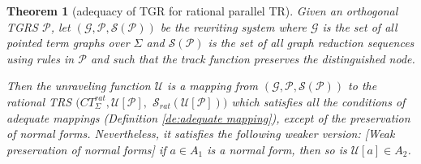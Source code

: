 \documentclass{eptcs}
\theoremstyle{plain}
\newtheorem{theorem}{Theorem} \newtheorem{lemma}[theorem]{Lemma}
\theoremstyle{definition}
\begin{document}
\begin{theorem} 
[adequacy of TGR for rational parallel TR]
\label{th:adequacy}
Given an orthogonal TGRS $\mathcal{P}$, let $(\mathcal{G}, \mathcal{P}, \mathcal{
S}(\mathcal{P}))$ be the rewriting system where $\mathcal{G}$ is the set of 
all pointed term graphs over $\Sigma$ and $\mathcal{S}(\mathcal{P})$ is the 
set of all graph reduction sequences using rules in $\mathcal{P}$ and 
such that the track function preserves the distinguished node. 

Then the unraveling function $\mathcal{U}$ is a mapping from  $(\mathcal{G}, 
\mathcal{P}, \mathcal{S}(\mathcal{P}))$ to the rational TRS $(CT_\Sigma^{rat}, 
\mathcal{
U}[\mathcal{P}],$ $\mathcal{S}_{rat}(\mathcal{U}[\mathcal{P}]))$ which satisfies all 
the conditions of adequate mappings (Definition \ref{de:adequate 
mapping}), except of the preservation of normal forms. Nevertheless, 
it satisfies the following weaker version: {\em [Weak preservation of 
normal forms]} if $a \in A_1$ is a normal form, then so is $\mathcal{
U}[a] \in A_2$.    

\end{theorem}
\end{document}
